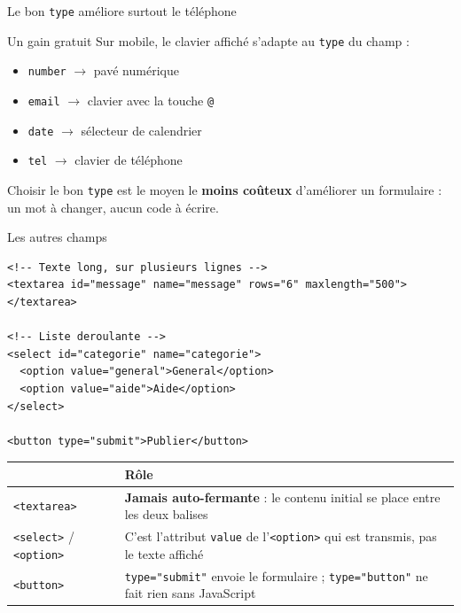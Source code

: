\documentclass[aspectratio=169,11pt]{beamer}
\newcommand{\hdr}[1]{\multicolumn{1}{l}{\color{white}\bfseries #1}}
\begin{document}
\begin{frame}{Le bon \texttt{type} améliore surtout le téléphone}
  \begin{exampleblock}{Un gain gratuit}
    Sur mobile, le clavier affiché s'adapte au \texttt{type} du champ :
    \begin{itemize}
      \item \texttt{number} $\rightarrow$ pavé numérique
      \item \texttt{email} $\rightarrow$ clavier avec la touche \texttt{@}
      \item \texttt{date} $\rightarrow$ sélecteur de calendrier
      \item \texttt{tel} $\rightarrow$ clavier de téléphone
    \end{itemize}
  \end{exampleblock}
  \vspace{0.3cm}
  \begin{center}
    \small Choisir le bon \texttt{type} est le moyen le \textbf{moins coûteux} d'améliorer un formulaire : un mot à changer, aucun code à écrire.
  \end{center}
\end{frame}

\begin{frame}[fragile]{Les autres champs}
\begin{lstlisting}[language=HTML5]
<!-- Texte long, sur plusieurs lignes -->
<textarea id="message" name="message" rows="6" maxlength="500"></textarea>

<!-- Liste deroulante -->
<select id="categorie" name="categorie">
  <option value="general">General</option>
  <option value="aide">Aide</option>
</select>

<button type="submit">Publier</button>
\end{lstlisting}
  \vspace{0.1cm}
  \begin{center}
  \scriptsize
  \begin{tabularx}{\textwidth}{lX}
    \toprule
    \rowcolor{accentBlue}
    \hdr{Balise} & \hdr{Rôle} \\
    \midrule
    \rowcolor{cfptGrey}
    \texttt{<textarea>} & \textbf{Jamais auto-fermante} : le contenu initial se place entre les deux balises \\
    \texttt{<select>} / \texttt{<option>} & C'est l'attribut \texttt{value} de l'\texttt{<option>} qui est transmis, pas le texte affiché \\
    \rowcolor{cfptGrey}
    \texttt{<button>} & \texttt{type="submit"} envoie le formulaire ; \texttt{type="button"} ne fait rien sans JavaScript \\
    \bottomrule
  \end{tabularx}
  \end{center}
\end{frame}
\end{document}
